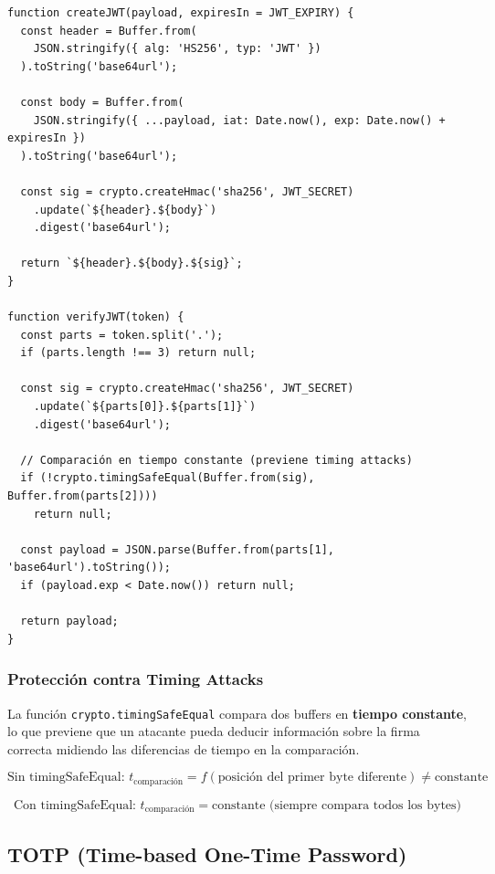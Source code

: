 \documentclass[12pt,a4paper,openany]{article}
\begin{document}
\begin{lstlisting}[style=jsstyle, caption={Creación y verificación JWT}]
function createJWT(payload, expiresIn = JWT_EXPIRY) {
  const header = Buffer.from(
    JSON.stringify({ alg: 'HS256', typ: 'JWT' })
  ).toString('base64url');
  
  const body = Buffer.from(
    JSON.stringify({ ...payload, iat: Date.now(), exp: Date.now() + expiresIn })
  ).toString('base64url');
  
  const sig = crypto.createHmac('sha256', JWT_SECRET)
    .update(`${header}.${body}`)
    .digest('base64url');
  
  return `${header}.${body}.${sig}`;
}

function verifyJWT(token) {
  const parts = token.split('.');
  if (parts.length !== 3) return null;
  
  const sig = crypto.createHmac('sha256', JWT_SECRET)
    .update(`${parts[0]}.${parts[1]}`)
    .digest('base64url');
  
  // Comparación en tiempo constante (previene timing attacks)
  if (!crypto.timingSafeEqual(Buffer.from(sig), Buffer.from(parts[2])))
    return null;
  
  const payload = JSON.parse(Buffer.from(parts[1], 'base64url').toString());
  if (payload.exp < Date.now()) return null;
  
  return payload;
}
\end{lstlisting}

\subsubsection{Protección contra Timing Attacks}

La función \texttt{crypto.timingSafeEqual} compara dos buffers en \textbf{tiempo constante}, lo que previene que un atacante pueda deducir información sobre la firma correcta midiendo las diferencias de tiempo en la comparación.

\begin{equation}
\text{Sin timingSafeEqual: } t_{\text{comparación}} = f(\text{posición del primer byte diferente}) \neq \text{constante}
\end{equation}

\begin{equation}
\text{Con timingSafeEqual: } t_{\text{comparación}} = \text{constante} \text{ (siempre compara todos los bytes)}
\end{equation}

\subsection{TOTP (Time-based One-Time Password)}
\end{document}
